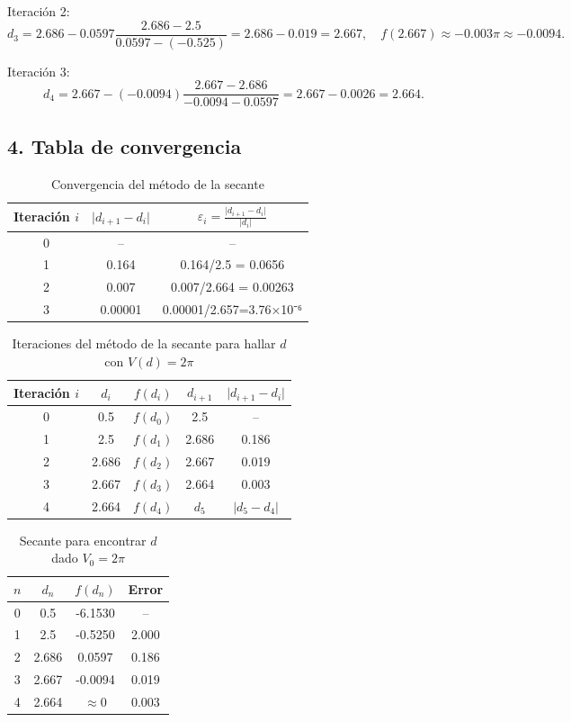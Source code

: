 \documentclass[12pt]{article}
\begin{document}
\begin{center}
Iteración 2:
\[
d_3=2.686 -0.0597\frac{2.686-2.5}{0.0597-(-0.525)}
=2.686 -0.019=2.667,\quad
f(2.667)\approx-0.003\pi\approx-0.0094.
\]

Iteración 3:
\[
d_4=2.667 -(-0.0094)\frac{2.667-2.686}{-0.0094-0.0597}
=2.667 -0.0026=2.664.
\]

\subsection*{4. Tabla de convergencia}

\begin{table}[H]
\centering
\caption{Convergencia del método de la secante}
\begin{tabular}{c|c|c}
\hline
\textbf{Iteración \(i\)} & \(\lvert d_{i+1}-d_{i}\rvert\) & \(\varepsilon_i=\tfrac{\lvert d_{i+1}-d_i\rvert}{\lvert d_i\rvert}\)\\
\hline
0 & –       & –         \\
1 & 0.164   & 0.164/2.5 = 0.0656  \\
2 & 0.007   & 0.007/2.664 = 0.00263 \\
3 & 0.00001 & 0.00001/2.657=3.76×10⁻⁶ \\
\hline
\end{tabular}
\end{table}

\begin{table}[h!]
\centering
\caption{Iteraciones del método de la secante para hallar \(d\) con \(V(d)=2\pi\)}
\begin{tabular}{c|c|c|c|c}
\hline
\textbf{Iteración \(i\)} & \(d_i\) & \(f(d_i)\) & \(d_{i+1}\) & \(\lvert d_{i+1}-d_i\rvert\) \\
\hline
0 & 0.5     & \(f(d_0)\) & 2.5     & –         \\
1 & 2.5     & \(f(d_1)\) & 2.686   & 0.186     \\
2 & 2.686   & \(f(d_2)\) & 2.667   & 0.019     \\
3 & 2.667   & \(f(d_3)\) & 2.664   & 0.003     \\
4 & 2.664   & \(f(d_4)\) & \(d_5\) & \(\lvert d_5-d_4\rvert\) \\
\hline
\end{tabular}
\end{table}

\begin{table}[H]
\centering
\begin{tabular}{cccc}
\toprule
\(n\) & \(d_n\)   & \(f(d_n)\)   & Error \\
\midrule
0 & 0.5   & -6.1530  & –     \\
1 & 2.5   & -0.5250  & 2.000 \\
2 & 2.686 & 0.0597   & 0.186 \\
3 & 2.667 & -0.0094  & 0.019 \\
4 & 2.664 & \(\approx0\) & 0.003 \\
\bottomrule
\end{tabular}
\caption{Secante para encontrar \(d\) dado \(V_0=2\pi\)}
\end{table}


\end{center}
\end{document}
